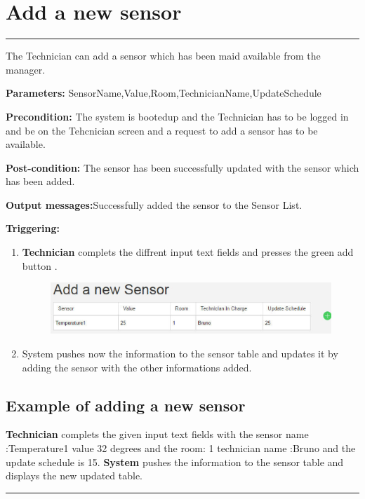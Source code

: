 \section{Add a new sensor}

\hrule
\hfill
\vspace{0.5cm}

\label{operation:Add a new sensor}
The Technician can add a sensor which has been maid available from the manager.
\begin{description}
\item \textbf{Parameters:} SensorName,Value,Room,TechnicianName,UpdateSchedule
\item \textbf{Precondition:} The system is bootedup and the Technician has to be
logged in and be on the Tehcnician screen and a request to add a sensor has to
be available.
\item \textbf{Post-condition:} The sensor has been successfully updated with the
sensor which has been added.
\item \textbf{Output messages:}Successfully added the sensor to the Sensor List.
\item \textbf{Triggering:}
\begin{enumerate}
\item \textbf{Technician} complets the diffrent input text fields and presses
the green add button .
\begin{figure}[H]
\includegraphics[width=1\textwidth]{images/AddANewSensorTechnician.eps}
\end{figure}
\item System pushes now the information to the sensor table and updates it by
adding the sensor with the other informations added.
\end{enumerate}
\end{description}

\subsection{Example of adding a new sensor}
\textbf{Technician} complets the given input text fields with the sensor name
:Temperature1 value 32 degrees and the room: 1 technician name :Bruno and the
update schedule is 15. \textbf{System} pushes the information to the sensor
table and displays the new updated table.
\hfill
\vspace{0.5cm}
\hrule



